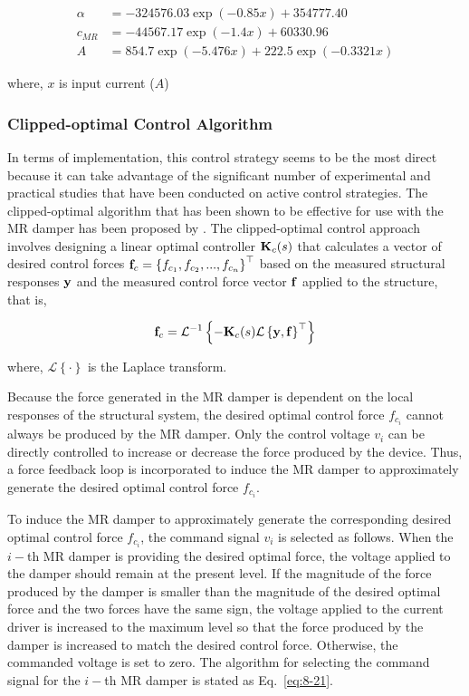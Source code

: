 \begin{align}
\alpha&=-324576.03\exp(-0.85x) + 354777.40 \label{eq:8-17} \\
c_{MR}&=-44567.17\exp(-1.4x) + 60330.96 \label{eq:8-18}\\
A&=854.7\exp(-5.476x) + 222.5\exp(-0.3321x) \label{eq:8-19}
\end{align}

where, $x$ is input current ($A$)

\subsubsection{Clipped-optimal Control Algorithm}
In terms of implementation, this control strategy seems to be the most direct because it can take advantage of the significant number of experimental and practical studies that have been conducted on active control strategies. The clipped-optimal algorithm that has been shown to be effective for use with the MR damper has been proposed by \citet{dyke1996modeling}. The clipped-optimal control approach involves designing a linear optimal controller $\mathbf{K}_{c}(s)$ that calculates a vector of desired control forces $\mathbf{f}_{c} = \left\{f_{c_{1}}, f_{c_{2}},...,f_{c_{n}}\right\}^{\top}$ based on the measured structural responses $\mathbf{y}$ and the measured control force vector $\mathbf{f}$ applied to the structure, that is,

\begin{equation}\label{eq:8-20}
\mathbf{f}_{c} = \mathcal{L}^{-1}\left\{-\mathbf{K}_{c}(s)\mathcal{L}\left\{\mathbf{y},\mathbf{f}\right\}^{\top}\right\}
\end{equation}

where, $\mathcal{L}\left\{\cdot\right\}$ is the Laplace transform.

Because the force generated in the MR damper is dependent on the local responses of the structural system, the desired optimal control force $f_{c_{i}}$ cannot always be produced by the MR damper. Only the control voltage $v_{i}$ can be directly controlled to increase or decrease the force produced by the device. Thus, a force feedback loop is incorporated to induce the MR damper to approximately generate the desired optimal control force $f_{c_{i}}$.

To induce the MR damper to approximately generate the corresponding desired optimal control force $f_{c_{i}}$, the command signal $v_{i}$ is selected as follows. When the $i-$th MR damper is providing the desired optimal force, the voltage applied to the damper should remain at the present level. If the magnitude of the force produced by the damper is smaller than the magnitude of the desired optimal force and the two forces have the same sign, the voltage applied to the current driver is increased to the maximum level so that the force produced by the damper is increased to match the desired control force. Otherwise, the commanded voltage is set to zero. The algorithm for selecting the command signal for the $i-$th MR damper is stated as Eq.~\eqref{eq:8-21}\citep{jansen2000semiactive}.

